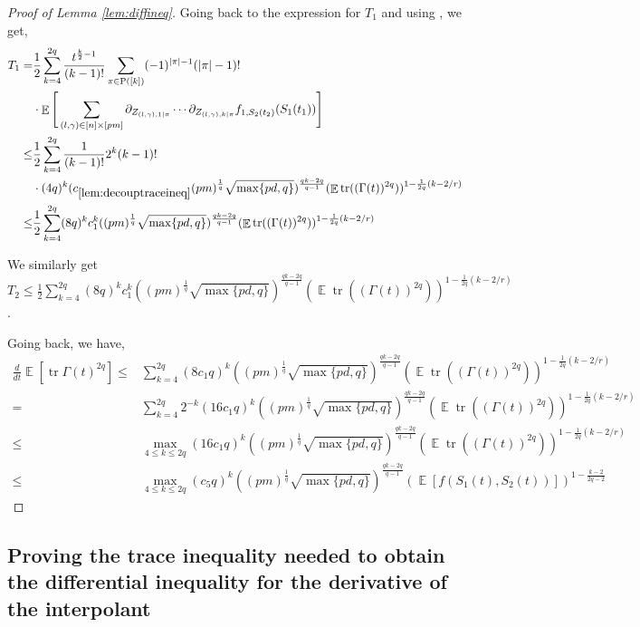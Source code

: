 \documentclass[11pt]{amsart}
\numberwithin{equation}{section}
\numberwithin{equation}{section}
\DeclareMathOperator{\E}{\mathbb{E}}
\DeclareMathOperator*{\tr}{tr}
\theoremstyle{remark}
\theoremstyle{definition}
\begin{document}
\begin{proof}[Proof of Lemma \ref{lem:diffineq}]
Going back to the expression for $T_1$ and using \cite[Lemma 6.4]{brailovskaya2022universality}, we get,
\begin{align*}
    T_1 =& \frac{1}{2}\sum_{k=4}^{2q}
	\frac{t^{\frac{k}{2}-1}}{(k-1)!}
	\sum_{\pi\in\mathrm{P}([k])}
	(-1)^{|\pi|-1}(|\pi|-1)!
	\\ &\cdot\E \Bigg[ \sum_{(l,\gamma) \in [n] \times [pm]} \partial_{Z_{(l,\gamma),1|\pi}}\cdots\partial_{Z_{(l,\gamma),k|\pi}}f_{1,S_2(t_2)}(S_1(t_1))
	\Bigg] \\
    \le& \frac{1}{2} \sum_{k=4}^{2q}
	\frac{1}{(k-1)!}  2^k (k-1)! \\ &\cdot (4q)^k   (c_{\ref*{lem:decouptraceineq}}(pm)^{\frac{1}{q}}\sqrt{\max\{pd,q\}})^{\frac{qk-2q}{q-1}}  (\E \tr((\Gamma(t))^{2q}))^{1-\frac{1}{2q}(k-2/r)} \\
    \le& \frac{1}{2} \sum_{k=4}^{2q} (8q)^k c_{1}^{k}  ((pm)^{\frac{1}{q}}\sqrt{\max\{pd,q\}})^{\frac{qk-2q}{q-1}}  (\E \tr((\Gamma(t))^{2q}))^{1-\frac{1}{2q}(k-2/r)}
\end{align*}

We similarly get $T_2 \le \frac{1}{2} \sum_{k=4}^{2q} (8q)^k c_{1}^{k}  ((pm)^{\frac{1}{q}}\sqrt{\max\{pd,q\}})^{\frac{qk-2q}{q-1}}  (\E \tr((\Gamma(t))^{2q}))^{1-\frac{1}{2q}(k-2/r)}$.

Going back, we have,
\begin{align*}
    \frac{d}{dt}\E[\tr \Gamma(t)^{2q}] \le&  \sum_{k=4}^{2q} (8c_1q)^k   ((pm)^{\frac{1}{q}}\sqrt{\max\{pd,q\}})^{\frac{qk-2q}{q-1}}  (\E \tr((\Gamma(t))^{2q}))^{1-\frac{1}{2q}(k-2/r)}
    \\ = & \sum_{k=4}^{2q} 2^{-k}(16c_1q)^k   ((pm)^{\frac{1}{q}}\sqrt{\max\{pd,q\}})^{\frac{qk-2q}{q-1}}  (\E \tr((\Gamma(t))^{2q}))^{1-\frac{1}{2q}(k-2/r)}
    \\ \le & \max \limits_{4 \le k \le 2q}(16c_1q)^k   ((pm)^{\frac{1}{q}}\sqrt{\max\{pd,q\}})^{\frac{qk-2q}{q-1}}  (\E \tr((\Gamma(t))^{2q}))^{1-\frac{1}{2q}(k-2/r)}
    \\ \le & \max \limits_{4 \le k \le 2q} (c_5q)^k ((pm)^{\frac{1}{q}}\sqrt{\max\{pd,q\}})^{\frac{qk-2q}{q-1}}(\E[f(S_1(t),S_2(t))])^{1-\frac{k-2}{2q-2}}
\end{align*}


\end{proof}

\subsection{Proving the trace inequality needed to obtain the differential inequality for the derivative of the interpolant} \label{subsec:osnaptraceineq}
\end{document}
